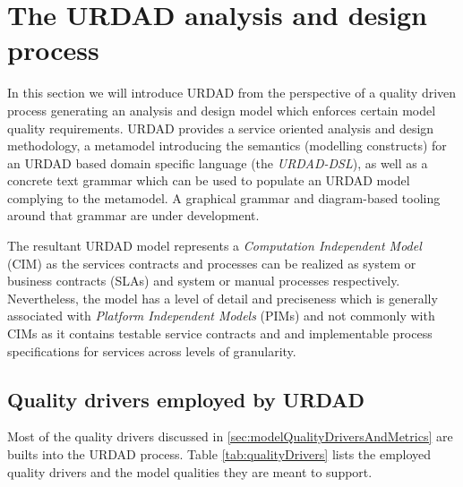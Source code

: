 \section{The URDAD analysis and design process}

In this section we will introduce URDAD from the perspective of a quality driven process generating an analysis and design model which enforces certain model quality requirements.  URDAD\cite{solms_generating_2009} provides a service oriented analysis and design methodology, a metamodel introducing the semantics (modelling constructs) for an URDAD based domain specific language (the \emph{URDAD-DSL}), as well as a concrete text grammar which can be used to populate an URDAD model complying to the metamodel. A graphical grammar and diagram-based tooling around that grammar are under development. 

The resultant URDAD model represents a \emph{Computation Independent Model} (CIM) as the services contracts and processes can be realized as system  or business contracts (SLAs) and system or manual processes respectively. Nevertheless, the model has a level of detail and preciseness which is generally associated with \emph{Platform Independent Models} (PIMs) and not commonly with CIMs as it contains testable service contracts and and implementable process specifications for services across levels of granularity.


\subsection{Quality drivers employed by URDAD}

Most of the quality drivers discussed in \ref{sec:modelQualityDriversAndMetrics} are builts into the URDAD process. Table \ref{tab:qualityDrivers} lists the employed quality drivers and the model qualities they are meant to support.

